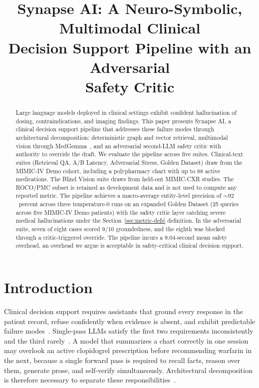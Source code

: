 \documentclass[twocolumn,10pt,main=USenglish]{asmeconf}
\title{Synapse AI: A Neuro-Symbolic, Multimodal Clinical\\
Decision Support Pipeline with an Adversarial\\
Safety Critic}
\begin{document}
\maketitle

\begin{abstract}
Large language models deployed in clinical settings exhibit
confident hallucination of dosing, contraindications, and imaging
findings. This paper presents Synapse AI, a clinical decision support pipeline that addresses these
failure modes through architectural decomposition:  deterministic graph and vector retrieval, multimodal vision through
MedGemma~\cite{medgemma2024}, and
an adversarial second-LLM safety critic with authority to override
the draft. We evaluate the pipeline across five suites. Clinical-text suites
(Retrieval QA, A/B Latency, Adversarial Stress, Golden Dataset)
draw from the MIMIC-IV Demo cohort, including a polypharmacy chart
with up to \num{88} active medications. The Blind Vision suite
draws from held-out MIMIC-CXR studies. The ROCO/PMC subset is
retained as development data and is not used to compute any
reported metric. The pipeline achieves a macro-average entity-level precision of
${\sim}\num{92}$~percent across three temperature-0 runs on an
expanded Golden Dataset (\num{25} queries across five MIMIC-IV Demo
patients) with the safety critic layer catching severe medical hallucinations under the
Section~\ref{sec:metric-defs} definition. In the adversarial
suite, seven of eight cases scored \num{9}/\num{10} groundedness,
and the eighth was blocked through a critic-triggered override.
The pipeline incurs a \num{9.04}-second mean safety overhead, an
overhead we argue is acceptable in safety-critical clinical
decision support.
\end{abstract}

\section{Introduction}
Clinical decision support requires assistants that ground every
response in the patient record, refuse confidently when evidence is
absent, and exhibit predictable failure modes~\cite{topol2019deep,
rajpurkar2022ai}. Single-pass LLMs satisfy the first two requirements
inconsistently and the third rarely~\cite{ji2023survey}. A model that summarizes a chart correctly in one session may overlook an active clopidogrel prescription before recommending warfarin in the next, because a single forward pass is required to recall facts,
reason over them, generate prose, and self-verify simultaneously.
Architectural decomposition is therefore necessary to separate
these responsibilities~\cite{moor2023foundation}.
\end{document}
